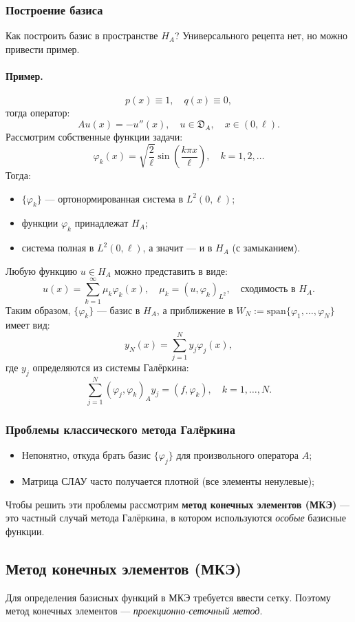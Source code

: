 \subsubsection{Построение базиса}
Как построить базис в пространстве $H_A$? Универсального рецепта нет, но можно привести пример.

\paragraph{Пример.}
\[
p(x) \equiv 1, \quad q(x) \equiv 0,
\]
тогда оператор:
\[
A u(x) = -u''(x), \quad u \in \mathfrak{D}_A, \quad x \in (0,\ell).
\]
Рассмотрим собственные функции задачи:
\[
\varphi_k(x) = \sqrt{\frac{2}{\ell}} \sin\left( \frac{k \pi x}{\ell} \right), \quad k = 1, 2, \dots
\]
Тогда:
\begin{itemize}
  \item $\{\varphi_k\}$ — ортонормированная система в $L^2(0,\ell)$;
  \item функции $\varphi_k$ принадлежат $H_A$;
  \item система полная в $L^2(0,\ell)$, а значит — и в $H_A$ (с замыканием).
\end{itemize}
Любую функцию $u \in H_A$ можно представить в виде:
\[
u(x) = \sum_{k=1}^\infty \mu_k \varphi_k(x), \quad \mu_k = (u, \varphi_k)_{L^2}, \quad \text{сходимость в } H_A.
\]
Таким образом, $\{\varphi_k\}$ — базис в $H_A$, а приближение в $W_N := \mathrm{span}\{\varphi_1, \dots, \varphi_N\}$ имеет вид:
\[
y_N(x) = \sum_{j=1}^N y_j \varphi_j(x),
\]
где $y_j$ определяются из системы Галёркина:
\[
\sum_{j=1}^N ( \varphi_j, \varphi_k )_A y_j = (f, \varphi_k), \quad k = 1, \dots, N.
\]

\subsubsection{Проблемы классического метода Галёркина}
\begin{itemize}
  \item Непонятно, откуда брать базис $\{\varphi_j\}$ для произвольного оператора $A$;
  \item Матрица СЛАУ часто получается плотной (все элементы ненулевые);
\end{itemize}
Чтобы решить эти проблемы рассмотрим \textbf{метод конечных элементов (МКЭ)} — это частный случай метода Галёркина, в котором используются \emph{особые} базисные функции.

\subsection{Метод конечных элементов (МКЭ)}
Для определения базисных функций в МКЭ требуется ввести сетку. Поэтому метод конечных элементов — \textit{проекционно-сеточный метод}.

